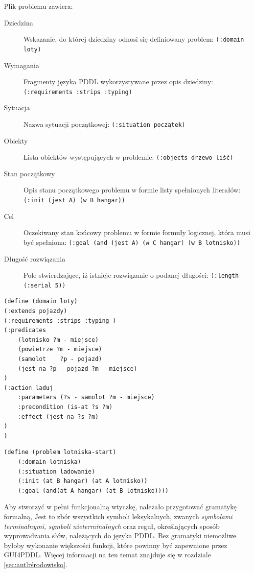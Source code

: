 Plik problemu zawiera:
\begin{description}
\item[Dziedzina] Wskazanie, do której dziedziny odnosi się definiowany problem: \texttt{(:domain loty)}
\item[Wymagania] Fragmenty języka PDDL wykorzystywane przez opis dziedziny: \texttt{(:requirements :strips :typing)}
\item[Sytuacja] Nazwa sytuacji początkowej: \texttt{(:situation początek)}
\item[Obiekty] Lista obiektów występujących w problemie: \texttt{(:objects drzewo liść)}
\item[Stan początkowy] Opis stanu początkowego problemu w formie listy spełnionych literałów: \texttt{(:init (jest A) (w B hangar))}
\item[Cel] Oczekiwany stan końcowy problemu w formie formuły logicznej, która musi być spełniona: \texttt{(:goal (and (jest A) (w C hangar) (w B lotnisko))}
\item[Długość rozwiązania] Pole stwierdzające, iż istnieje rozwiązanie o podanej długości: \texttt{(:length (:serial 5))}
\end{description}
\begin{Code}
\begin{lstlisting}[language=LISP,frame=single,label=ana_code, caption=Zawartość przykładowego pliku dziedziny]
(define (domain loty)
(:extends pojazdy)
(:requirements :strips :typing )
(:predicates
	(lotnisko ?m - miejsce)
	(powietrze ?m - miejsce)
	(samolot	?p - pojazd)
	(jest-na ?p - pojazd ?m - miejsce)
)
(:action laduj
	:parameters (?s - samolot ?m - miejsce)
   	:precondition (is-at ?s ?m) 
	:effect (jest-na ?s ?m) 
)
)
\end{lstlisting}
\end{Code}

\begin{Code}
\begin{lstlisting}[language=LISP,frame=single,label=ana_code, caption=Zawartość przykładowego pliku problemu]
(define (problem lotniska-start)
	(:domain lotniska)
	(:situation ladowanie)
	(:init (at B hangar) (at A lotnisko))
	(:goal (and(at A hangar) (at B lotnisko))))
\end{lstlisting}
\end{Code}

Aby stworzyć w pełni funkcjonalną wtyczkę, należało przygotować gramatykę formalną, Jest to zbór wszystkich symboli leksykalnych, zwanych \emph{symbolami terminalnymi, symboli nieterminalnych} oraz reguł, określających sposób wyprowadzania słów, należących do języka PDDL. Bez gramatyki niemożliwe byłoby wykonanie większości funkcji, które powinny być zapewnione przez GUI4PDDL. Więcej informacji na ten temat znajduje się w rozdziale \ref{sec:antlrśrodowisko}.

